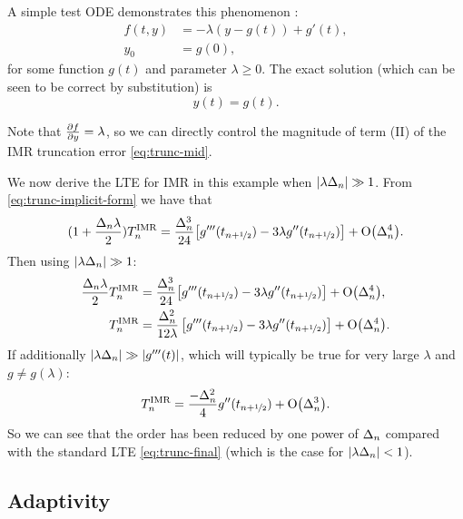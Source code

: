 A simple test ODE demonstrates this phenomenon \cite[157]{Atkinson2009}:
\begin{equation}
  \begin{aligned}
    \label{eqn:imr-test-order-reduction}
    f(t, y) &= -\lambda (y - g(t)) + g'(t), \\
    y_0 &= g(0),
  \end{aligned}
\end{equation}
for some function $g(t)$ and parameter $\lambda \geq 0$.
The exact solution (which can be seen to be correct by substitution) is
\begin{equation}
  y(t) = g(t).
\end{equation}

Note that $\frac{\partial f}{\partial y} = \lambda$, so we can directly control the magnitude of term (II) of the IMR truncation error \eqref{eq:trunc-mid}.

We now derive the LTE for IMR in this example when $\left|{\lambda\Delta_{n}} \right| \gg 1$.
From \cref{eq:trunc-implicit-form} we have that
\begin{equation}
  \begin{aligned}
    (1 + \frac{\Delta_{n} \lambda}{2})T_n^{\text{IMR}} &= \frac{\Delta_{n}^3}{24}
    {\left[ g'''(t_{n+\nicefrac{1}{2}}) - 3 \lambda g''(t_{n+\nicefrac{1}{2}}) \right]} + \text{O}{\left( \Delta_{n}^4 \right)}. \\ 
  \end{aligned}
\end{equation}
Then using $\left|{\lambda\Delta_{n}} \right| \gg 1$:
\begin{equation}
  \begin{aligned}
    \frac{\Delta_{n} \lambda}{2} T_n^{\text{IMR}} &= \frac{\Delta_{n}^3}{24}
    {\left[ g'''(t_{n+\nicefrac{1}{2}}) - 3 \lambda g''(t_{n+\nicefrac{1}{2}}) \right]} + \text{O}{\left( \Delta_{n}^4 \right)}, \\ 
    T_n^{\text{IMR}} &= \frac{\Delta_{n}^2}{12\lambda} \left[g'''(t_{n+\nicefrac{1}{2}}) - 3 \lambda g''(t_{n+\nicefrac{1}{2}}) \right] + \text{O}{\left( \Delta_{n}^4 \right)}. \\
  \end{aligned}
\end{equation}
If additionally $\left|{\lambda\Delta_{n}} \right| \gg \left|{g'''(t)} \right|$, which will typically be true for very large $\lambda$ and $g \neq g(\lambda)$:
\begin{equation}
  T_n^{\text{IMR}} = \frac{-\Delta_{n}^2}{4} g''(t_{n+\nicefrac{1}{2}}) + \text{O}{\left( \Delta_{n}^3 \right)}.
  \label{eq:reduced-order-imr-truncation-error}
\end{equation}
So we can see that the order has been reduced by one power of $\Delta_{n}$ compared with the standard LTE \cref{eq:trunc-final} (which is the case for $\left|{\lambda\Delta_{n}} \right| < 1$).


\subsection{Adaptivity}
\label{sec:adaptivity}

